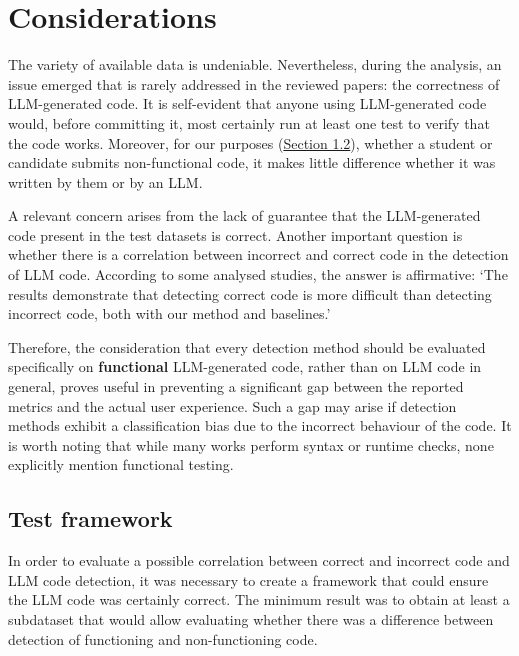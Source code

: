 \clearpage

\section{Considerations}
The variety of available data is undeniable. 
Nevertheless, during the analysis, an issue emerged that is rarely 
addressed in the reviewed papers: the correctness of 
LLM-generated code. It is self-evident that anyone using 
LLM-generated code would, before committing it, 
most certainly run at least one test to verify that the 
code works. Moreover, for our purposes 
(\hyperref[sec:Motivations Behind LLM-Generated Code Detection]{Section 1.2}), 
whether a student or candidate submits non-functional 
code, it makes little difference whether it was written by them or 
by an LLM. 

A relevant concern arises from the lack of guarantee 
that the LLM-generated code present in the test datasets is 
correct. Another important question is whether there is a 
correlation between incorrect and correct code in the detection of 
LLM code. According to some analysed studies, the answer is affirmative: 
‘The results demonstrate that detecting correct code is more difficult 
than detecting incorrect code, both with our method and 
baselines.’~\cite{ye2023uncovering}

Therefore, the consideration that every detection method 
should be evaluated specifically on \textbf{functional} LLM-generated code, 
rather than on LLM code in general, proves useful in preventing a 
significant gap between the reported metrics and the actual user 
experience. Such a gap may arise if detection methods exhibit a 
classification bias due to the incorrect behaviour of the code. 
It is worth noting that while many works perform syntax or runtime 
checks, none explicitly mention functional testing.


\newpage
\subsection{Test framework}
\label{section:Test framework}
In order to evaluate a possible correlation between correct and incorrect 
 code and LLM code detection, it was necessary to create a framework that 
could ensure the LLM code was certainly correct. The minimum result was 
to obtain at least a subdataset that would allow evaluating whether there was a 
difference between detection of functioning and non-functioning code.

